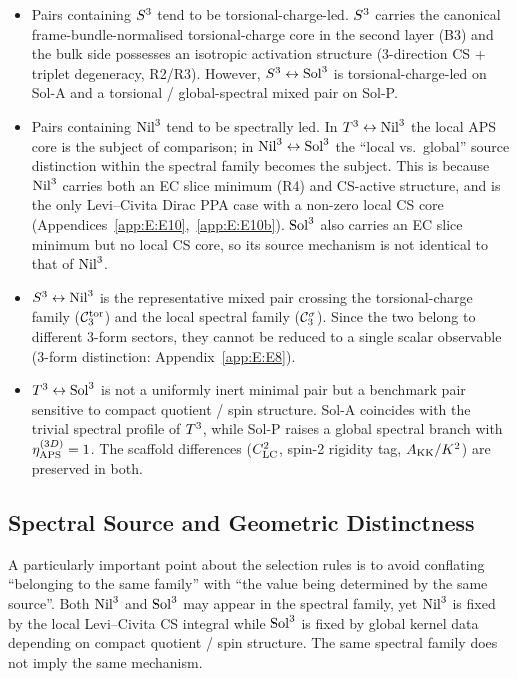 \begin{itemize}
  \item Pairs containing $S^3$ tend to be torsional-charge-led.
        $S^3$ carries the canonical frame-bundle-normalised
        torsional-charge core in the second layer (B3) and the bulk side
        possesses an isotropic activation structure (3-direction CS +
        triplet degeneracy, R2/R3).  However,
        $S^3\leftrightarrow\mathrm{Sol}^3$ is torsional-charge-led on Sol-A
        and a torsional / global-spectral mixed pair on Sol-P.
  \item Pairs containing $\mathrm{Nil}^3$ tend to be spectrally led.  In
        $T^3\leftrightarrow\mathrm{Nil}^3$ the local APS core is the subject
        of comparison; in $\mathrm{Nil}^3\leftrightarrow\mathrm{Sol}^3$ the
        ``local vs.\ global'' source distinction within the spectral family
        becomes the subject.  This is because $\mathrm{Nil}^3$ carries both an EC
        slice minimum (R4) and CS-active structure, and is the only Levi--Civita
        Dirac PPA case with a non-zero local CS core
        (Appendices~\ref{app:E:E10},~\ref{app:E:E10b}).  $\mathrm{Sol}^3$ also
        carries an EC slice minimum but no local CS core, so its source
        mechanism is not identical to that of $\mathrm{Nil}^3$.
  \item $S^3\leftrightarrow\mathrm{Nil}^3$ is the representative mixed pair
        crossing the torsional-charge family ($\mathcal{C}_3^{\mathrm{tor}}$) and the local
        spectral family ($\mathcal{C}_3^{\sigma}$).  Since the two belong to different
        3-form sectors, they cannot be reduced to a single scalar
        observable (3-form distinction: Appendix~\ref{app:E:E8}).
  \item $T^3\leftrightarrow\mathrm{Sol}^3$ is not a uniformly inert minimal
        pair but a benchmark pair sensitive to compact quotient / spin
        structure.  Sol-A coincides with the trivial spectral profile of
        $T^3$, while Sol-P raises a global spectral branch with
        $\eta_{\mathrm{APS}}^{(3D)} = 1$.  The scaffold differences ($C^2_{\mathrm{LC}}$, spin-2
        rigidity tag, $A_{\mathrm{KK}}/K^2$) are preserved in both.
\end{itemize}

\subsection{Spectral Source and Geometric Distinctness}
\label{sec:rules:source}

A particularly important point about the selection rules is to avoid
conflating ``belonging to the same family'' with ``the value being
determined by the same source''.  Both $\mathrm{Nil}^3$ and $\mathrm{Sol}^3$ may
appear in the spectral family, yet $\mathrm{Nil}^3$ is fixed by the local
Levi--Civita CS integral while $\mathrm{Sol}^3$ is fixed by global kernel data
depending on compact quotient / spin structure.  The same spectral family
does not imply the same mechanism.

